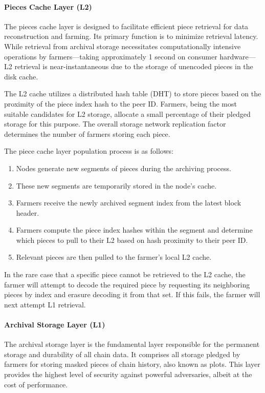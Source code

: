 \documentclass[conference]{IEEEtran}
\begin{document}
\paragraph{Pieces Cache Layer (L2)}

The pieces cache layer is designed to facilitate efficient piece retrieval for data reconstruction and farming. Its primary function is to minimize retrieval latency. While retrieval from archival storage necessitates computationally intensive operations by farmers—taking approximately 1 second on consumer hardware—L2 retrieval is near-instantaneous due to the storage of unencoded pieces in the disk cache.

The L2 cache utilizes a distributed hash table (DHT) to store pieces based on the proximity of the piece index hash to the peer ID. Farmers, being the most suitable candidates for L2 storage, allocate a small percentage of their pledged storage for this purpose. The overall storage network replication factor determines the number of farmers storing each piece.

The piece cache layer population process is as follows:

\begin{enumerate}
    \item Nodes generate new segments of pieces during the archiving process.
    \item These new segments are temporarily stored in the node's cache.
    \item Farmers receive the newly archived segment index from the latest block header.
    \item Farmers compute the piece index hashes within the segment and determine which pieces to pull to their L2 based on hash proximity to their peer ID.
    \item Relevant pieces are then pulled to the farmer's local L2 cache.
\end{enumerate}

In the rare case that a specific piece cannot be retrieved to the L2 cache, the farmer will attempt to decode the required piece by requesting its neighboring pieces by index and erasure decoding it from that set. If this fails, the farmer will next attempt L1 retrieval.

\paragraph{Archival Storage Layer (L1)}

The archival storage layer is the fundamental layer responsible for the permanent storage and durability of all chain data. It comprises all storage pledged by farmers for storing masked pieces of chain history, also known as plots. This layer provides the highest level of security against powerful adversaries, albeit at the cost of performance.
\end{document}
